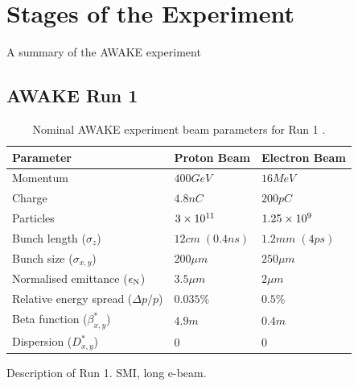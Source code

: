 \section{Stages of the Experiment}
\label{WFA:AWAKE}

A summary of the AWAKE experiment

\subsection{AWAKE Run 1}
\label{WFA:AWAKE:R1}

\begin{table}[hbt]
    \centering
    \caption{Nominal AWAKE experiment beam parameters for Run 1 \cite{gschwendtner:2014, gschwendtner:2016}.}
    \label{T:AWAKE-Run1}
    \begin{tabular}{lll}
        \hline
        \textbf{Parameter} & \textbf{Proton Beam} & \textbf{Electron Beam} \\
        \hline
        Momentum &
            $400\unit{GeV}$               & $16\unit{MeV}$ \\
        Charge &
            $4.8\unit{nC}$                & $200\unit{pC}$ \\
        Particles &
            $3\times 10^{11}$                  & $1.25\times 10^{9}$ \\
        Bunch length ($\sigma_{z}$) &
            $12\unit{cm}\;(0.4\unit{ns})$ & $1.2\unit{mm}\;(4\unit{ps})$ \\
        Bunch size ($\sigma_{x,y}$) &
            $200\unit{\mu m}$             & $250\unit{\mu m}$ \\
        Normalised emittance ($\epsilon_{\mathrm{N}}$) &
            $3.5\unit{\mu m}$             & $2\unit{\mu m}$ \\
        Relative energy spread ($\Delta p/p$) &
            $0.035\%$                     & $0.5\%$ \\
        Beta function ($\beta^{*}_{x,y}$) &
            $4.9\unit{m}$                 & $0.4\unit{m}$ \\
        Dispersion ($D^{*}_{x,y}$) &
            $0$                           & $0$ \\
        \hline
    \end{tabular}
\end{table}

Description of Run 1. SMI, long e-beam.

